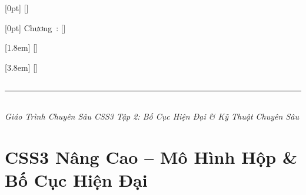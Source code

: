 \documentclass[11pt,oneside]{book}
\begin{document}
\makeatletter
\renewcommand{\tableofcontents}{%
  \chapter*{\contentsname}%
  {\color{accentOrange}\rule{3.5cm}{2.5pt}}\\[3pt]%
  {\sffamily\small\color{codeComment}\itshape
   Giáo Trình Chuyên Sâu CSS3 \textendash{} Tập 2: Bố Cục Hiện Đại \& Kỹ Thuật Chuyên Sâu}%
  \par\vspace{16pt}%
  \@starttoc{toc}%
}
\makeatother

\contentsmargin{2.2em}

[0pt]
  {\addvspace{20pt}\sffamily\large\bfseries\color{primaryBlue}}
  {}
  {}
  {\hfill\textbf{\color{primaryBlue}\contentspage}}
  [\addvspace{6pt}]

[0pt]
  {\addvspace{12pt}\sffamily\normalsize\bfseries\color{darkText}}
  {\textcolor{primaryBlue}{Chương\ \thecontentslabel:\enskip}}
  {\textcolor{primaryBlue}{}}
  {\enspace\titlerule*[0.5pc]{\textcolor{primaryBlue!30}{.}}\enspace\textbf{\color{primaryBlue}\contentspage}}
  [\addvspace{3pt}]

[1.8em]
  {\addvspace{4pt}\sffamily\normalsize\color{darkText}}
  {\textcolor{primaryBlue}{\bfseries\thecontentslabel}\enskip}
  {\textcolor{darkText}{}}
  {\enspace\titlerule*[0.5pc]{\textcolor{gray!35}{.}}\enspace\textcolor{darkText}{\contentspage}}
  [\addvspace{1pt}]

[3.8em]
  {\addvspace{1.5pt}\sffamily\small\color{darkText!75}}
  {\textcolor{secondaryTeal!80}{\thecontentslabel}\enskip}
  {\textcolor{darkText!75}{}}
  {\enspace\titlerule*[0.5pc]{\textcolor{gray!22}{.}}\enspace\textcolor{darkText!70}{\contentspage}}
  []

\begingroup
\setlength{\parskip}{0pt}
\pagestyle{plain}
\tableofcontents
\endgroup
\clearpage

\mainmatter

\part{CSS3 Nâng Cao -- Mô Hình Hộp \& Bố Cục Hiện Đại}
\end{document}
